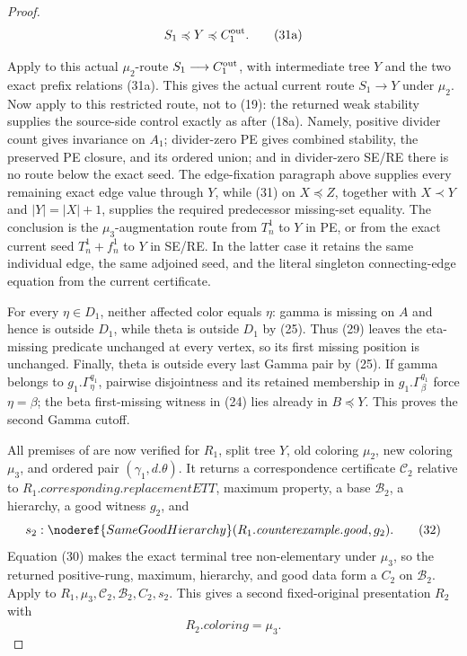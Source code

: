 \begin{proof}
\[
                 S_1\preccurlyeq Y\preccurlyeq C_1^{\rm out}. \tag{31a}
\]

Apply  to this actual
$\mu_2$-route $S_1\longrightarrow C_1^{\rm out}$, with intermediate
tree $Y$ and the two exact prefix relations (31a).  This gives the actual
current route $S_1\longrightarrow Y$ under $\mu_2$.  Now apply
 to this
restricted route, not to (19): the returned weak stability supplies the
source-side control exactly as after (18a).  Namely, positive divider
count gives invariance on $A_1$; divider-zero PE gives combined stability,
the preserved PE closure, and its ordered union; and in divider-zero
SE/RE there is no route below the exact seed.  The edge-fixation paragraph
above supplies every remaining exact edge value through $Y$, while (31)
on $X\preccurlyeq Z$, together with $X\prec Y$ and $|Y|=|X|+1$, supplies
the required predecessor missing-set equality.  The conclusion is the
$\mu_3$-augmentation route from $T_n^1$ to $Y$ in PE, or from the exact
current seed $T_n^1+f_n^1$ to $Y$ in SE/RE.  In the latter case it
retains the same individual edge, the same adjoined seed, and the literal
singleton connecting-edge equation from the current certificate.

For every $\eta\in D_1$, neither affected color equals $\eta$: gamma is
missing on $A$ and hence is outside $D_1$, while theta is outside $D_1$
by (25).  Thus (29) leaves the eta-missing predicate unchanged at every
vertex, so its first missing position is unchanged.  Finally, theta is
outside every last Gamma pair by (25).  If gamma belongs to
$g_1.\Gamma^{q_1}_\eta$, pairwise disjointness and its retained
membership in $g_1.\Gamma^{q_1}_\beta$ force $\eta=\beta$; the beta
first-missing witness in (24) lies already in $B\preccurlyeq Y$.  This
proves the second Gamma cutoff.

All premises of  are now
verified for $R_1$, split tree $Y$, old coloring $\mu_2$, new coloring
$\mu_3$, and ordered pair $(\gamma_1,d.\theta)$.  It returns a
correspondence certificate $\mathcal C_2$ relative to
$R_1.\mathit{corresponding.replacementETT}$, maximum property, a base
$\mathcal B_2$, a hierarchy, a good witness $g_2$, and
\[
 s_2:\noderef{SameGoodHierarchy}
        (R_1.\mathit{counterexample.good},g_2).                \tag{32}
\]
Equation (30) makes the exact terminal tree non-elementary under
$\mu_3$, so the returned positive-rung, maximum, hierarchy, and good
data form a  $C_2$ on $\mathcal B_2$.
Apply  to
$R_1,\mu_3,\mathcal C_2,\mathcal B_2,C_2,s_2$.  This gives a second
fixed-original presentation $R_2$ with
\[
                         R_2.\mathit{coloring}=\mu_3.          \tag{33}
\]


\end{proof}
